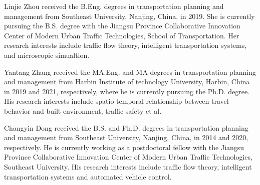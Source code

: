 \documentclass[journal]{IEEEtran}
\begin{document}
\begin{IEEEbiography}{Linjie Zhou}
  received the B.Eng. degrees in transportation planning and management from Southeast University, Nanjing, China, in 2019. She is currently pursuing the B.S. degree with the Jiangsu Province Collaborative Innovation Center of Modern Urban Traffic Technologies, School of Transportation. Her research interests include traffic flow theory, intelligent transportation systems, and microscopic simualtion.
\end{IEEEbiography}

\begin{IEEEbiography}{Yantang Zhang}
  received the MA.Eng. and MA degrees in transportation planning and management from Harbin Institute of technology University, Harbin, China in 2019 and 2021, respectively, where he is currently pursuing the Ph.D. degree. His research interests include spatio-temporal relationship between travel behavior and built environment, traffic safety et al.
\end{IEEEbiography}

\begin{IEEEbiography}{Changyin Dong}
  received the B.S. and Ph.D. degrees in transportation planning and management from Southeast University, Nanjing, China, in 2014 and 2020, respectively. He is currently working as a postdoctoral fellow with the Jiangsu Province Collaborative Innovation Center of Modern Urban Traffic Technologies, Southeast University. His research interests include traffic flow theory, intelligent transportation systems and automated vehicle control.
\end{IEEEbiography}
\end{document}
